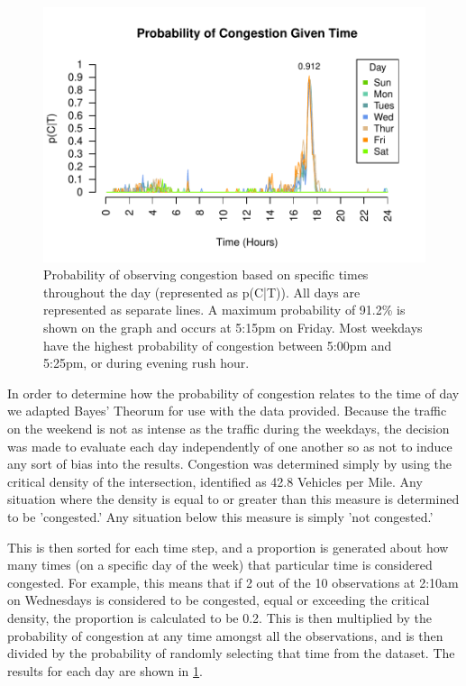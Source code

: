 \documentclass{report}
\begin{document}
\begin{figure}[H] \label{fig:bayesplot}
\centering
\includegraphics{upstat_report-bayesplot}
\caption{ Probability of observing congestion based on specific times throughout the day (represented as p(C|T)). All days are represented as separate lines. A maximum probability of 91.2\% is shown on the graph and occurs at 5:15pm on Friday. Most weekdays have the highest probability of congestion between 5:00pm and 5:25pm, or during evening rush hour.}
\end{figure}

In order to determine how the probability of congestion relates to the time of day we adapted Bayes' Theorum for use with the data provided. Because the traffic on the weekend is not as intense as the traffic during the weekdays, the decision was made to evaluate each day independently of one another so as not to induce any sort of bias into the results. Congestion was determined simply by using the critical density of the intersection, identified as 42.8 Vehicles per Mile. Any situation where the density is equal to or greater than this measure is determined to be 'congested.' Any situation below this measure is simply 'not congested.'

This is then sorted for each time step, and a proportion is generated about how many times (on a specific day of the week) that particular time is considered congested. For example, this means that if 2 out of the 10 observations at 2:10am on Wednesdays is considered to be congested, equal or exceeding the critical density, the proportion is calculated to be 0.2. This is then multiplied by the probability of congestion at any time amongst all the observations, and is then divided by the probability of randomly selecting that time from the dataset. The results for each day are shown in \ref{fig:bayesplot}.
\end{document}
